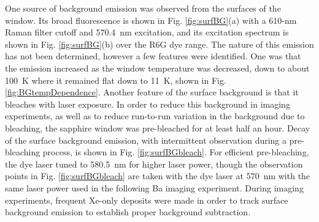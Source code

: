 One source of background emission was observed from the surfaces of the window.  Its broad fluorescence is shown in Fig. \ref{fig:surfBG}(a) with a 610-nm Raman filter cutoff and 570.4~nm excitation, and its excitation spectrum is shown in Fig. \ref{fig:surfBG}(b) over the R6G dye range.  The nature of this emission has not been determined, however a few features were identified.  One was that the emission increased as the window temperature was decreased, down to about 100~K where it remained flat down to 11~K, shown in Fig. \ref{fig:BGtempDependence}.  Another feature of the surface background is that it bleaches with laser exposure.  In order to reduce this background in imaging experiments, as well as to reduce run-to-run variation in the background due to bleaching, the sapphire window was pre-bleached for at least half an hour.  Decay of the surface background emission, with intermittent observation during a pre-bleaching process, is shown in Fig. \ref{fig:surfBGbleach}.  For efficient pre-bleaching, the dye laser tuned to 580.5~nm for higher laser power, though the observation points in Fig. \ref{fig:surfBGbleach} are taken with the dye laser at 570~nm with the same laser power used in the following Ba imaging experiment.  During imaging experiments, frequent Xe-only deposits were made in order to track surface background emission to establish proper background subtraction.





